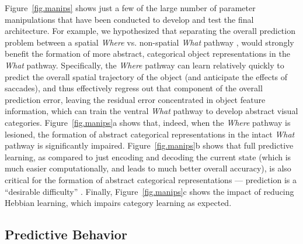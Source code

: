 \documentclass[11pt,twoside]{article}
\newif\myifpdf
\begin{document}
Figure~\ref{fig.manips} shows just a few of the large number of parameter manipulations that have been conducted to develop and test the final architecture.  For example, we hypothesized that separating the overall prediction problem between a spatial \emph{Where} vs. non-spatial \emph{What} pathway \citep{UngerleiderMishkin82,GoodaleMilner92}, would strongly benefit the formation of more abstract, categorical object representations in the \emph{What} pathway.  Specifically, the \emph{Where} pathway can learn relatively quickly to predict the overall spatial trajectory of the object (and anticipate the effects of saccades), and thus effectively regress out that component of the overall prediction error, leaving the residual error concentrated in object feature information, which can train the ventral \emph{What} pathway to develop abstract visual categories.  Figure~\ref{fig.manips}a shows that, indeed, when the \emph{Where} pathway is lesioned, the formation of abstract categorical representations in the intact \emph{What} pathway is significantly impaired.  Figure~\ref{fig.manips}b shows that full predictive learning, as compared to just encoding and decoding the current state (which is much easier computationally, and leads to much better overall accuracy), is also critical for the formation of abstract categorical representations --- prediction is a ``desirable difficulty'' \citep{Bjork94}.  Finally, Figure~\ref{fig.manips}c shows the impact of reducing Hebbian learning, which impairs category learning as expected.

\subsection{Predictive Behavior}
\end{document}
